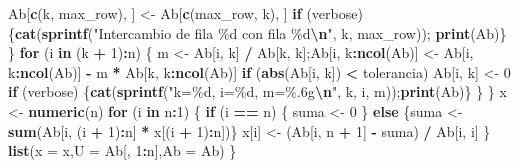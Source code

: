 \documentclass[
]{book}
\newenvironment{Shaded}{\begin{snugshade}}{\end{snugshade}}
\newcommand{\AttributeTok}[1]{\textcolor[rgb]{0.13,0.29,0.53}{#1}}
\newcommand{\ControlFlowTok}[1]{\textcolor[rgb]{0.13,0.29,0.53}{\textbf{#1}}}
\newcommand{\DecValTok}[1]{\textcolor[rgb]{0.00,0.00,0.81}{#1}}
\newcommand{\FunctionTok}[1]{\textcolor[rgb]{0.13,0.29,0.53}{\textbf{#1}}}
\newcommand{\NormalTok}[1]{#1}
\newcommand{\OtherTok}[1]{\textcolor[rgb]{0.56,0.35,0.01}{#1}}
\newcommand{\SpecialCharTok}[1]{\textcolor[rgb]{0.81,0.36,0.00}{\textbf{#1}}}
\newcommand{\StringTok}[1]{\textcolor[rgb]{0.31,0.60,0.02}{#1}}
\begin{document}
\begin{Shaded}
\begin{Highlighting}[]
\NormalTok{      Ab[}\FunctionTok{c}\NormalTok{(k, max\_row), ] }\OtherTok{\textless{}{-}}\NormalTok{ Ab[}\FunctionTok{c}\NormalTok{(max\_row, k), ]}
      \ControlFlowTok{if}\NormalTok{ (verbose) \{}\FunctionTok{cat}\NormalTok{(}\FunctionTok{sprintf}\NormalTok{(}\StringTok{"Intercambio de fila \%d con fila \%d}\SpecialCharTok{\textbackslash{}n}\StringTok{"}\NormalTok{, k, max\_row)); }\FunctionTok{print}\NormalTok{(Ab)\}}
\NormalTok{    \}}
    \ControlFlowTok{for}\NormalTok{ (i }\ControlFlowTok{in}\NormalTok{ (k }\SpecialCharTok{+} \DecValTok{1}\NormalTok{)}\SpecialCharTok{:}\NormalTok{n) \{}
\NormalTok{      m }\OtherTok{\textless{}{-}}\NormalTok{ Ab[i, k] }\SpecialCharTok{/}\NormalTok{ Ab[k, k];Ab[i, k}\SpecialCharTok{:}\FunctionTok{ncol}\NormalTok{(Ab)] }\OtherTok{\textless{}{-}}\NormalTok{ Ab[i, k}\SpecialCharTok{:}\FunctionTok{ncol}\NormalTok{(Ab)] }\SpecialCharTok{{-}}\NormalTok{ m }\SpecialCharTok{*}\NormalTok{ Ab[k, k}\SpecialCharTok{:}\FunctionTok{ncol}\NormalTok{(Ab)]}
      \ControlFlowTok{if}\NormalTok{ (}\FunctionTok{abs}\NormalTok{(Ab[i, k]) }\SpecialCharTok{\textless{}}\NormalTok{ tolerancia) Ab[i, k] }\OtherTok{\textless{}{-}} \DecValTok{0}
      \ControlFlowTok{if}\NormalTok{ (verbose) \{}\FunctionTok{cat}\NormalTok{(}\FunctionTok{sprintf}\NormalTok{(}\StringTok{"k=\%d, i=\%d, m=\%.6g}\SpecialCharTok{\textbackslash{}n}\StringTok{"}\NormalTok{, k, i, m));}\FunctionTok{print}\NormalTok{(Ab)\}}
\NormalTok{    \}}
\NormalTok{  \}}
\NormalTok{  x }\OtherTok{\textless{}{-}} \FunctionTok{numeric}\NormalTok{(n)}
  \ControlFlowTok{for}\NormalTok{ (i }\ControlFlowTok{in}\NormalTok{ n}\SpecialCharTok{:}\DecValTok{1}\NormalTok{) \{}
    \ControlFlowTok{if}\NormalTok{ (i }\SpecialCharTok{==}\NormalTok{ n) \{}
\NormalTok{      suma }\OtherTok{\textless{}{-}} \DecValTok{0}
\NormalTok{    \} }\ControlFlowTok{else}\NormalTok{ \{suma }\OtherTok{\textless{}{-}} \FunctionTok{sum}\NormalTok{(Ab[i, (i }\SpecialCharTok{+} \DecValTok{1}\NormalTok{)}\SpecialCharTok{:}\NormalTok{n] }\SpecialCharTok{*}\NormalTok{ x[(i }\SpecialCharTok{+} \DecValTok{1}\NormalTok{)}\SpecialCharTok{:}\NormalTok{n])\}}
\NormalTok{    x[i] }\OtherTok{\textless{}{-}}\NormalTok{ (Ab[i, n }\SpecialCharTok{+} \DecValTok{1}\NormalTok{] }\SpecialCharTok{{-}}\NormalTok{ suma) }\SpecialCharTok{/}\NormalTok{ Ab[i, i]}
\NormalTok{  \}}
  \FunctionTok{list}\NormalTok{(}\AttributeTok{x =}\NormalTok{ x,}\AttributeTok{U =}\NormalTok{ Ab[, }\DecValTok{1}\SpecialCharTok{:}\NormalTok{n],}\AttributeTok{Ab =}\NormalTok{ Ab)}
\NormalTok{\}}
\end{Highlighting}
\end{Shaded}
\end{document}
